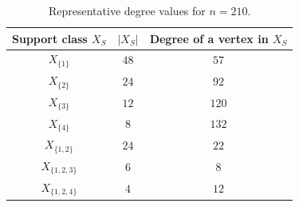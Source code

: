 \documentclass[12pt]{article}
\theoremstyle{definition}
\begin{document}
	\begin{table}[H]
		\centering
		\caption{Representative degree values for $n=210$.}
		\label{tab:n210degree}
		\begin{tabular}{ccc}
			\toprule
			Support class $X_S$ & $|X_S|$ & Degree of a vertex in $X_S$ \\
			\midrule
			$X_{\{1\}}$ & $48$ & $57$ \\
			$X_{\{2\}}$ & $24$ & $92$ \\
			$X_{\{3\}}$ & $12$ & $120$ \\
			$X_{\{4\}}$ & $8$ & $132$ \\
			$X_{\{1,2\}}$ & $24$ & $22$ \\
			$X_{\{1,2,3\}}$ & $6$ & $8$ \\
			$X_{\{1,2,4\}}$ & $4$ & $12$ \\
			\bottomrule
		\end{tabular}
	\end{table}
\end{document}
